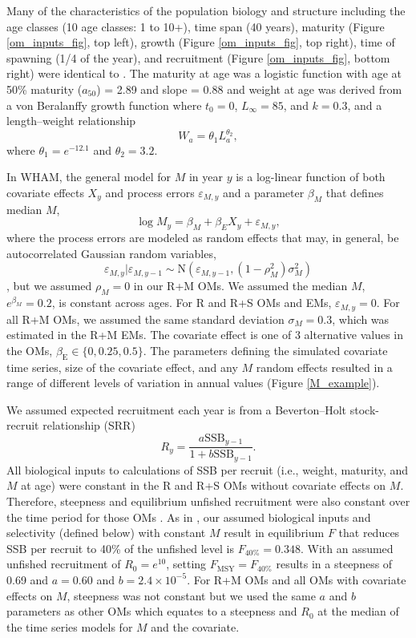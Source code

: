 \documentclass[
  12pt,
]{article}
\newcommand{\Fmsy}{\ensuremath{F_{\text{MSY}}}\xspace}
\begin{document}
Many of the characteristics of the population biology and structure including the age classes (10 age classes: 1 to 10+), time span (40 years), maturity (Figure \ref{om_inputs_fig}, top left), growth (Figure \ref{om_inputs_fig}, top right), time of spawning (1/4 of the year), and recruitment (Figure \ref{om_inputs_fig}, bottom right) were identical to \citet{milleretal_inreview1}. The maturity at age was a logistic function with age at 50\% maturity (\(a_{50}\)) = 2.89 and slope = 0.88 and weight at age was derived from a von Beralanffy growth function where \(t_0 = 0\), \(L_\infty = 85\), and \(k = 0.3\), and a length--weight relationship
\[
W_a = \theta_1 L_a^{\theta_2},
\]
where \(\theta_1 = e^{-12.1}\) and \(\theta_2 = 3.2\).

In WHAM, the general model for \(M\) in year \(y\) is a log-linear function of both covariate effects \(X_y\) and process errors \(\varepsilon_{M,y}\) and a parameter \(\beta_{M}\) that defines median \(M\),
\[
\log M_y = \beta_M + \beta_{E} X_y + \varepsilon_{M,y},
\]
where the process errors are modeled as random effects that may, in general, be autocorrelated Gaussian random variables,
\[
\varepsilon_{M,y}|\varepsilon_{M,y-1} \sim \text{N}\left(\varepsilon_{M,y-1},(1-\rho_M^2)\sigma_M^2\right)
\]
\citep{stockmiller21}, but we assumed \(\rho_M = 0\) in our R+M OMs. We assumed the median \(M\), \(e^{\beta_M} = 0.2\), is constant across ages. For R and R+S OMs and EMs, \(\varepsilon_{M,y} = 0\). For all R+M OMs, we assumed the same standard deviation \(\sigma_M = 0.3\), which was estimated in the R+M EMs. The covariate effect is one of 3 alternative values in the OMs, \(\beta_\text{E} \in \{0,0.25,0.5\}\). The parameters defining the simulated covariate time series, size of the covariate effect, and any \(M\) random effects resulted in a range of different levels of variation in annual values (Figure \ref{M_example}).

We assumed expected recruitment each year is from a Beverton--Holt stock-recruit relationship (SRR)
\[
R_{y} = \frac{a \text{SSB}_{y-1}}{1 + b \text{SSB}_{y-1}}.
\]
All biological inputs to calculations of SSB per recruit (i.e., weight, maturity, and \(M\) at age) were constant in the R and R+S OMs without covariate effects on \(M\). Therefore, steepness and equilibrium unfished recruitment were also constant over the time period for those OMs \citep{millerbrooks21}. As in \citet{milleretal_inreview1}, our assumed biological inputs and selectivity (defined below) with constant \(M\) result in equilibrium \(F\) that reduces SSB per recruit to 40\% of the unfished level is \(F_{40\%} = 0.348\). With an assumed unfished recruitment of \(R_0 = e^{10}\), setting \(\Fmsy = F_{40\%}\) results in a steepness of 0.69 and \(a=0.60\) and \(b = 2.4 \times 10^{-5}\). For R+M OMs and all OMs with covariate effects on \(M\), steepness was not constant but we used the same \(a\) and \(b\) parameters as other OMs which equates to a steepness and \(R_0\) at the median of the time series models for \(M\) and the covariate.
\end{document}
